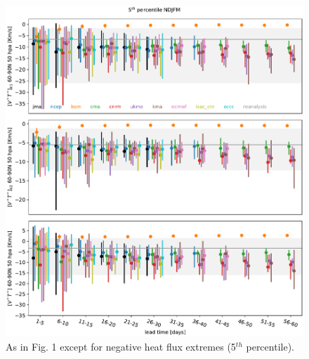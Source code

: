 \documentclass[12pt]{article}
\begin{document}
\begin{spacing}{1}
\begin{figure}[H]
\centering
\includegraphics[scale=0.75]{fig_02.pdf}
\caption{As in Fig. 1 except for negative heat flux extremes (5$^{th}$ percentile).}
\label{f2}
\end{figure}


\end{spacing}
\end{document}
